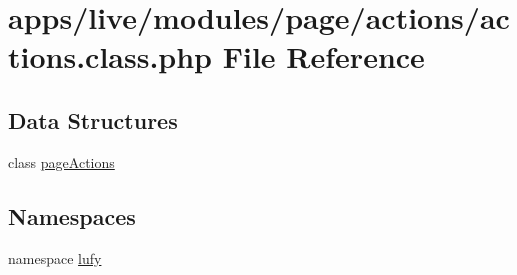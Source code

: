 \hypertarget{live_2modules_2page_2actions_2actions_8class_8php}{\section{apps/live/modules/page/actions/actions.class.\-php File Reference}
\label{live_2modules_2page_2actions_2actions_8class_8php}
}
\subsection*{Data Structures}
\begin{DoxyCompactItemize}
\item 
class \hyperlink{classpage_actions}{page\-Actions}
\end{DoxyCompactItemize}
\subsection*{Namespaces}
\begin{DoxyCompactItemize}
\item 
namespace \hyperlink{namespacelufy}{lufy}
\end{DoxyCompactItemize}
